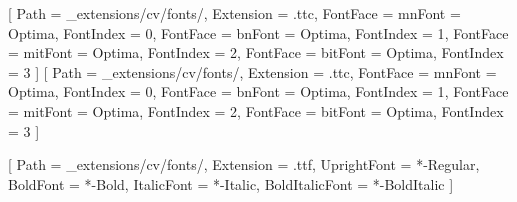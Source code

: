 \usepackage{marvosym} %
\usepackage{parskip} %
\usepackage{ragged2e} %
\setlength{\RaggedRightParindent}{0pt}

\setlength{\parskip}{3pt} %
\linespread{0.96} %


\makeatletter
\renewcommand{\sectionlinesformat}[4]{%
  #3#4\par\nobreak
  \vspace{-11pt}%
  \rule{\textwidth}{0.5pt}\par\nobreak
  \vspace{0pt}%
}
\makeatother


\usepackage{fontspec}
\setmainfont{Optima}[
  Path           = _extensions/cv/fonts/,
  Extension      = .ttc,
  FontFace       = {m}{n}{Font = Optima, FontIndex = 0},
  FontFace       = {b}{n}{Font = Optima, FontIndex = 1},
  FontFace       = {m}{it}{Font = Optima, FontIndex = 2},
  FontFace       = {b}{it}{Font = Optima, FontIndex = 3}
]
\setsansfont{Optima}[
  Path           = _extensions/cv/fonts/,
  Extension      = .ttc,
  FontFace       = {m}{n}{Font = Optima, FontIndex = 0},
  FontFace       = {b}{n}{Font = Optima, FontIndex = 1},
  FontFace       = {m}{it}{Font = Optima, FontIndex = 2},
  FontFace       = {b}{it}{Font = Optima, FontIndex = 3}
]


\setmonofont{MapleMono-NF}[
  Path           = _extensions/cv/fonts/,
  Extension      = .ttf,
  UprightFont    = *-Regular,
  BoldFont       = *-Bold,
  ItalicFont     = *-Italic,
  BoldItalicFont = *-BoldItalic
]



\usepackage{fancyhdr}

\pagestyle{fancy}
\fancyhf{}
\renewcommand{\headrulewidth}{0pt} %
\renewcommand{\footrulewidth}{0pt} %
\usepackage{lastpage} %


\usepackage{hyperref}
\usepackage{color}
\hypersetup{colorlinks,breaklinks,urlcolor=linkcolour, linkcolor=linkcolour}

\raggedright
\let\oldpar\par
\def\par{\oldpar\raggedright}
